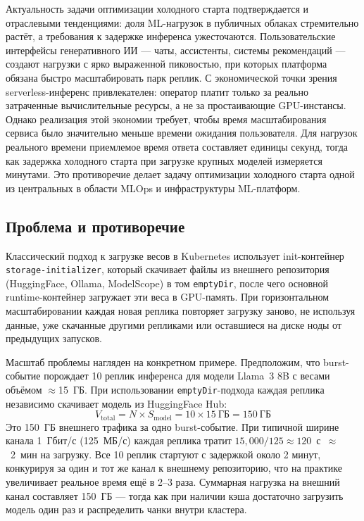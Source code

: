 Актуальность задачи оптимизации холодного старта подтверждается и отраслевыми тенденциями: доля ML-нагрузок в публичных облаках стремительно растёт, а требования к задержке инференса ужесточаются. Пользовательские интерфейсы генеративного ИИ --- чаты, ассистенты, системы рекомендаций --- создают нагрузки с ярко выраженной пиковостью, при которых платформа обязана быстро масштабировать парк реплик. С экономической точки зрения serverless-инференс привлекателен: оператор платит только за реально затраченные вычислительные ресурсы, а не за простаивающие GPU-инстансы. Однако реализация этой экономии требует, чтобы время масштабирования сервиса было значительно меньше времени ожидания пользователя. Для нагрузок реального времени приемлемое время ответа составляет единицы секунд, тогда как задержка холодного старта при загрузке крупных моделей измеряется минутами. Это противоречие делает задачу оптимизации холодного старта одной из центральных в области MLOps и инфраструктуры ML-платформ.

\subsection*{Проблема и противоречие}

Классический подход к загрузке весов в Kubernetes использует init-контейнер \texttt{storage-initializer}, который скачивает файлы из внешнего репозитория (HuggingFace, Ollama, ModelScope) в том \texttt{emptyDir}, после чего основной runtime-контейнер загружает эти веса в GPU-память. При горизонтальном масштабировании каждая новая реплика повторяет загрузку заново, не используя данные, уже скачанные другими репликами или оставшиеся на диске ноды от предыдущих запусков.

Масштаб проблемы нагляден на конкретном примере. Предположим, что burst-событие порождает 10 реплик инференса для модели Llama~3 8B с весами объёмом $\approx$15~ГБ. При использовании \texttt{emptyDir}-подхода каждая реплика независимо скачивает модель из HuggingFace Hub:
\[
  V_{\mathrm{total}} = N \times S_{\mathrm{model}} = 10 \times 15~\text{ГБ} = 150~\text{ГБ}
\]
Это 150~ГБ внешнего трафика за одно burst-событие. При типичной ширине канала 1~Гбит/с (125~МБ/с) каждая реплика тратит $15{,}000 / 125 \approx 120$~с~$\approx$~2~мин на загрузку. Все 10 реплик стартуют с задержкой около 2 минут, конкурируя за один и тот же канал к внешнему репозиторию, что на практике увеличивает реальное время ещё в 2--3 раза. Суммарная нагрузка на внешний канал составляет 150~ГБ --- тогда как при наличии кэша достаточно загрузить модель один раз и распределить чанки внутри кластера.

